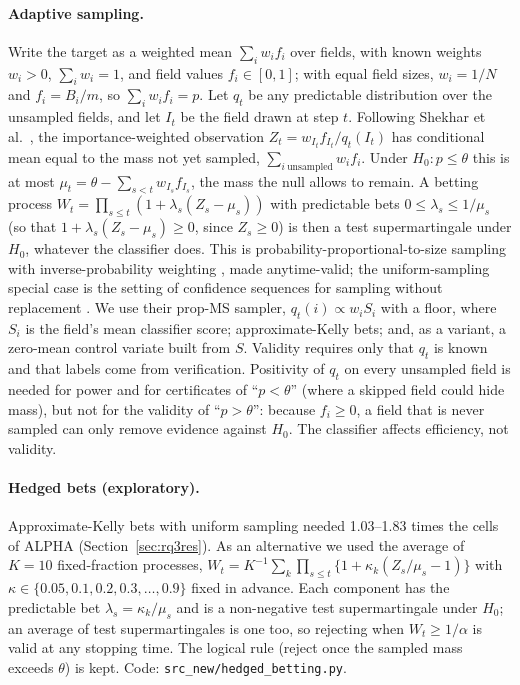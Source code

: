 \documentclass[11pt]{article}
\theoremstyle{remark}
\theoremstyle{definition}
\begin{document}
\paragraph{Adaptive sampling.} Write the target as a weighted mean $\sum_i w_i f_i$ over fields, with known weights $w_i>0$, $\sum_i w_i=1$, and field values $f_i\in[0,1]$; with equal field sizes, $w_i=1/N$ and $f_i=B_i/m$, so $\sum_i w_if_i=p$. Let $q_t$ be any predictable distribution over the unsampled fields, and let $I_t$ be the field drawn at step $t$. Following Shekhar et al.\ \cite{shekhar2023rlfa}, the importance-weighted observation $Z_t=w_{I_t}f_{I_t}/q_t(I_t)$ has conditional mean equal to the mass not yet sampled, $\sum_{i\ \text{unsampled}}w_if_i$. Under $H_0:p\le\theta$ this is at most $\mu_t=\theta-\sum_{s<t}w_{I_s}f_{I_s}$, the mass the null allows to remain. A betting process $W_t=\prod_{s\le t}(1+\lambda_s(Z_s-\mu_s))$ with predictable bets $0\le\lambda_s\le1/\mu_s$ (so that $1+\lambda_s(Z_s-\mu_s)\ge0$, since $Z_s\ge0$) is then a test supermartingale under $H_0$, whatever the classifier does. This is probability-proportional-to-size sampling with inverse-probability weighting \cite{hansen1943,horvitz1952}, made anytime-valid; the uniform-sampling special case is the setting of confidence sequences for sampling without replacement \cite{waudbysmith2020wor}. We use their prop-MS sampler, $q_t(i)\propto w_iS_i$ with a floor, where $S_i$ is the field's mean classifier score; approximate-Kelly bets; and, as a variant, a zero-mean control variate built from $S$. Validity requires only that $q_t$ is known and that labels come from verification. Positivity of $q_t$ on every unsampled field is needed for power and for certificates of ``$p<\theta$'' (where a skipped field could hide mass), but not for the validity of ``$p>\theta$'': because $f_i\ge0$, a field that is never sampled can only remove evidence against $H_0$. The classifier affects efficiency, not validity.

\paragraph{Hedged bets (exploratory).} Approximate-Kelly bets with uniform sampling needed 1.03--1.83 times the cells of ALPHA (Section~\ref{sec:rq3res}). As an alternative we used the average of $K=10$ fixed-fraction processes, $W_t=K^{-1}\sum_{k}\prod_{s\le t}\{1+\kappa_k(Z_s/\mu_s-1)\}$ with $\kappa\in\{0.05,0.1,0.2,0.3,\dots,0.9\}$ fixed in advance. Each component has the predictable bet $\lambda_s=\kappa_k/\mu_s$ and is a non-negative test supermartingale under $H_0$; an average of test supermartingales is one too, so rejecting when $W_t\ge1/\alpha$ is valid at any stopping time. The logical rule (reject once the sampled mass exceeds $\theta$) is kept. Code: \texttt{src\_new/hedged\_betting.py}.
\end{document}
